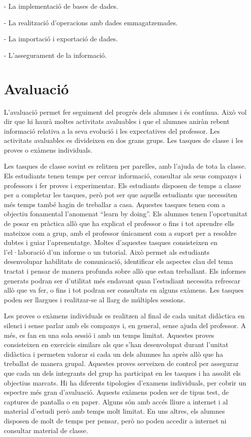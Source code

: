 \documentclass[catalan, a4paper, 12pt, titlepage]{article}
\begin{document}
- La implementació de bases de dades.

- La realització d'operacions amb dades emmagatzemades.

- La importació i exportació de dades.

- L'assegurament de la informació.

\section{Avaluació}

L'avaluació permet fer seguiment del progrés dels alumnes i és contínua.
Això vol dir que hi haurà moltes activitats avaluables i que el alumnes aniràn rebent informació relativa a la seva evolució i les expectatives del professor.
Les activitats avaluables es divideixen en dos grans grups. 
Les tasques de classe i les proves o exàmens individuals.

Les tasques de classe sovint es relitzen per parelles, amb l'ajuda de tota la classe.
Els estudiants tenen temps per cercar informació, consultar als seus companys i professors i fer proves i experimentar. 
Els estudiants disposen de temps a classe per a completar les tasques, però pot ser que aquells estudiants que necessiten més temps també hagin de treballar a casa.
Aquestes tasques tenen com a objectiu fonamental l'anomenat ``learn by doing''.
Els alumnes tenen l'oportunitat de posar en pràctica allò que ha explicat el professor o fins i tot aprendre ells mateixos com a grup, amb el professor únicament com a suport per a resoldre dubtes i guiar l'aprenentatge.
Moltes d'aquestes tasques consisteixen en l'el·laboració d'un informe o un tutorial.
Això permet als estudiants desenvolupar habilitats de comunicació, identificar els aspectes clau del tema tractat i pensar de manera profunda sobre allò que estan treballant. Els informes generats podran ser d'utilitat més endavant quan l'estudiant necessita refrescar allò que va fer, o fins i tot podran ser consultats en alguns exàmens.
Les tasques poden ser llargues i realitzar-se al llarg de múltiples sessions.

Les proves o exàmens individuals es realitzen al final de cada unitat didàctica en silenci i sense parlar amb els companys i, en general, sense ajuda del professor.
A més, es fan en una sola sessió i amb un temps limitat.
Aquestes proves consisteixen en exercicis similars als que s'han desenvolupat durant l'unitat didàctica i permeten valorar si cada un dels alumnes ha après allò que ha treballat de manera grupal.
Aquestes proves serveixen de control per assegurar que cada un dels integrants del grup ha participat en les tasques i ha assolit els objectius marcats.
Hi ha diferents tipologies d'examens individuals, per cobrir un espectre més gran d'avaluació. Aquests exàmens poden ser de tipus test, de captures de pantalla o en paper. 
Alguns són amb accés lliure a internet i al material d'estudi però amb temps molt limitat.
En uns altres, els alumnes disposen de molt de temps per pensar, però no poden accedir a internet ni consultar material de classe.
\end{document}
